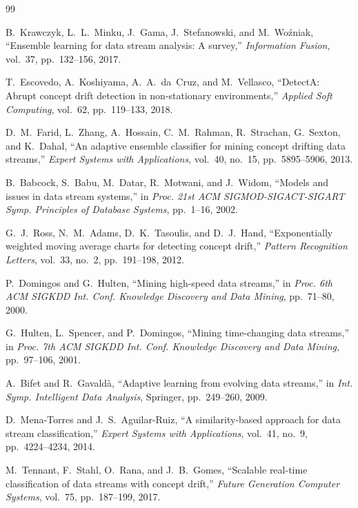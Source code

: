 \documentclass[12pt,a4paper]{article}
\begin{document}
	\begin{thebibliography}{99}
		
		B.~Krawczyk, L.~L.~Minku, J.~Gama, J.~Stefanowski, and M.~Wo\'zniak,
		``Ensemble learning for data stream analysis: A survey,''
		\textit{Information Fusion}, vol.~37, pp.~132--156, 2017.
		
		T.~Escovedo, A.~Koshiyama, A.~A.~da~Cruz, and M.~Vellasco,
		``DetectA: Abrupt concept drift detection in non-stationary environments,''
		\textit{Applied Soft Computing}, vol.~62, pp.~119--133, 2018.
		
		D.~M.~Farid, L.~Zhang, A.~Hossain, C.~M.~Rahman, R.~Strachan, G.~Sexton, and K.~Dahal,
		``An adaptive ensemble classifier for mining concept drifting data streams,''
		\textit{Expert Systems with Applications}, vol.~40, no.~15, pp.~5895--5906, 2013.
		
		B.~Babcock, S.~Babu, M.~Datar, R.~Motwani, and J.~Widom,
		``Models and issues in data stream systems,''
		in \textit{Proc. 21st ACM SIGMOD-SIGACT-SIGART Symp. Principles of Database Systems}, pp.~1--16, 2002.
		
		G.~J.~Ross, N.~M.~Adams, D.~K.~Tasoulis, and D.~J.~Hand,
		``Exponentially weighted moving average charts for detecting concept drift,''
		\textit{Pattern Recognition Letters}, vol.~33, no.~2, pp.~191--198, 2012.
		
		P.~Domingos and G.~Hulten,
		``Mining high-speed data streams,''
		in \textit{Proc. 6th ACM SIGKDD Int. Conf. Knowledge Discovery and Data Mining}, pp.~71--80, 2000.
		
		G.~Hulten, L.~Spencer, and P.~Domingos,
		``Mining time-changing data streams,''
		in \textit{Proc. 7th ACM SIGKDD Int. Conf. Knowledge Discovery and Data Mining}, pp.~97--106, 2001.
		
		A.~Bifet and R.~Gavald\`{a},
		``Adaptive learning from evolving data streams,''
		in \textit{Int. Symp. Intelligent Data Analysis}, Springer, pp.~249--260, 2009.
		
		D.~Mena-Torres and J.~S.~Aguilar-Ruiz,
		``A similarity-based approach for data stream classification,''
		\textit{Expert Systems with Applications}, vol.~41, no.~9, pp.~4224--4234, 2014.
		
		M.~Tennant, F.~Stahl, O.~Rana, and J.~B.~Gomes,
		``Scalable real-time classification of data streams with concept drift,''
		\textit{Future Generation Computer Systems}, vol.~75, pp.~187--199, 2017.
		

\end{thebibliography}
\end{document}
